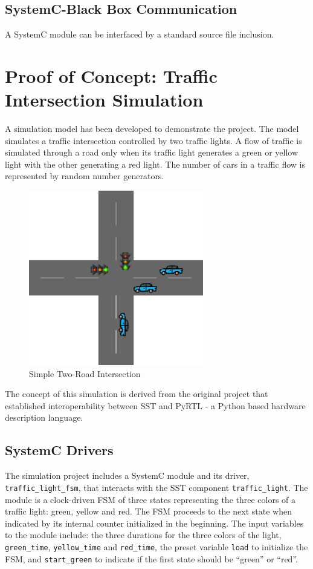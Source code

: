 \documentclass{article}
\begin{document}
    \subsection{SystemC-Black Box Communication}
    A SystemC module can be interfaced by a standard source file inclusion.

  \section{Proof of Concept: Traffic Intersection Simulation}
  A simulation model has been developed to demonstrate the project. The model simulates a traffic
  intersection controlled by two traffic lights. A flow of traffic is simulated through a road only
  when its traffic light generates a green or yellow light with the other generating a red light.
  The number of cars in a traffic flow is represented by random number generators.

  \begin{figure}[!h]
    \centering
    \includegraphics[width=3in]{diagrams/intersection.png}
    \caption{Simple Two-Road Intersection}
    \label{fig:intersection}
  \end{figure}

  The concept of this simulation is derived from the original project that established
  interoperability between SST and PyRTL - a Python based hardware description
  language.\cite{pyrtl-sst}

    \subsection{SystemC Drivers}
    The simulation project includes a SystemC module and its driver, \lstinline{traffic_light_fsm},
    that interacts with the SST component \lstinline{traffic_light}. The module is a clock-driven
    FSM of three states representing the three colors of a traffic light: green, yellow and red. The
    FSM proceeds to the next state when indicated by its internal counter initialized in the
    beginning. The input variables to the module include: the three durations for the three colors
    of the light, \lstinline{green_time}, \lstinline{yellow_time} and \lstinline{red_time}, the
    preset variable \lstinline{load} to initialize the FSM, and \lstinline{start_green} to indicate
    if the first state should be ``green'' or ``red''.
\end{document}
